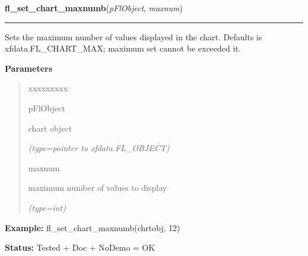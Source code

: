     \label{xformslib:flchart:fl_set_chart_maxnumb}

    \vspace{0.5ex}

\hspace{.8\funcindent}\begin{boxedminipage}{\funcwidth}

    \raggedright \textbf{fl\_set\_chart\_maxnumb}(\textit{pFlObject}, \textit{maxnum})

    \vspace{-1.5ex}

    \rule{\textwidth}{0.5\fboxrule}
\setlength{\parskip}{2ex}
    Sets the maximum number of values displayed in the chart. Defaults is 
    xfdata.FL\_CHART\_MAX; maximum set cannot be exceeded it.

\setlength{\parskip}{1ex}
      \textbf{Parameters}
      \vspace{-1ex}

      \begin{quote}
        \begin{Ventry}{xxxxxxxxx}

          \item[pFlObject]

          chart object

            {\it (type=pointer to xfdata.FL\_OBJECT)}

          \item[maxnum]

          maximum number of values to display

            {\it (type=int)}

        \end{Ventry}

      \end{quote}

\textbf{Example:} fl\_set\_chart\_maxnumb(chrtobj, 12)



\textbf{Status:} Tested + Doc + NoDemo = OK



    \end{boxedminipage}

    \label{xformslib:flchart:fl_set_chart_autosize}

